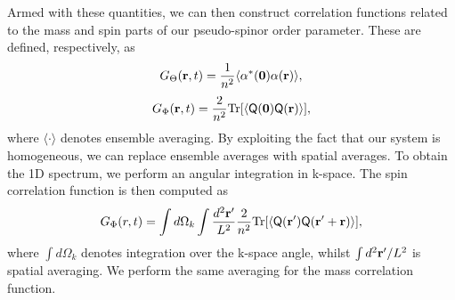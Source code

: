 Armed with these quantities, we can then construct correlation functions related
to the mass and spin parts of our pseudo-spinor order parameter.
These are defined, respectively, as
\begin{equation}
    G_\Theta(\vb{r}, t) = \frac{1}{n^2}\langle
        \alpha^*(\vb{0})\alpha(\vb{r})
    \rangle,
\end{equation}
\begin{equation}
    G_\Phi(\vb{r}, t) =
    \frac{2}{n^2}\mathrm{Tr}
    [\langle \mathsf{Q}(\vb{0})\mathsf{Q}(\vb{r})\rangle],
\end{equation}
where \( \langle \cdot \rangle \) denotes ensemble averaging.
By exploiting the fact that our system is homogeneous, we can replace ensemble
averages with spatial averages.
To obtain the 1D spectrum, we perform an angular integration in k-space.
The spin correlation function is then computed as
\begin{equation}
    G_\Phi(r, t) = \int d\Omega_k \int \frac{d^2\vb{r}^\prime}{L^2}
    \frac{2}{n^2}\text{Tr}
    [\langle \mathsf{Q}(\vb{r}^\prime)\mathsf{Q}(\vb{r}^\prime+\vb{r})\rangle],
\end{equation}
where \(\int d\Omega_k\) denotes integration over the k-space angle, whilst
\(\int d^2\vb{r}'/L^2\) is spatial averaging.
We perform the same averaging for the mass correlation function.

